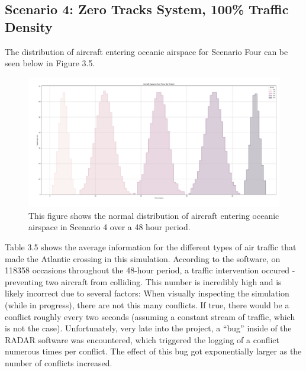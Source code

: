 \documentclass[stu, a4paper, 12pt, floatsintext]{apa7}
\numberwithin{figure}{section}
\numberwithin{table}{section}
\numberwithin{equation}{section}
\begin{document}
\subsection{Scenario 4: Zero Tracks System, 100\% Traffic Density}
The distribution of aircraft entering oceanic airspace for Scenario Four can be seen below in Figure 3.5.

\begin{figure}[H]
    \caption{This figure shows the normal distribution of aircraft entering oceanic airspace in Scenario 4 over a 48 hour period.}
    \label{fig:3.5}
    \centering
    \includegraphics[width=1.1\textwidth]{pictures/Figure 3.5.png}    
\end{figure}

Table 3.5 shows the average information for the different types of air traffic that made the Atlantic crossing in this simulation. According to the software, on 118358 occasions throughout the 48-hour period, a traffic intervention occured - preventing two aircraft from colliding. This number is incredibly high and is likely incorrect due to several factors:
When visually inspecting the simulation (while in progress), there are not this many conflicts. 
If true, there would be a conflict roughly every two seconds (assuming a constant stream of traffic, which is not the case). 
Unfortunately, very late into the project, a “bug” inside of the RADAR software was encountered, which triggered the logging of a conflict numerous times per conflict. The effect of this bug got exponentially larger as the number of conflicts increased.
\end{document}
